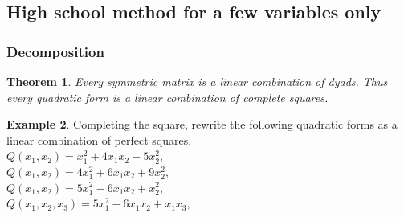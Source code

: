 \documentclass[aspectratio=169,notheorems]{corvinusmetropolis}
\newtheorem{theorem}{Theorem}
\theoremstyle{definition}
\newtheorem{example}[theorem]{Example}
\begin{document}
\subsection{High school method for a few variables only}
\begin{frame}
    \frametitle{Decomposition}
    \begin{theorem}
        Every symmetric matrix is a linear combination of dyads. Thus
        every quadratic form is a linear combination of complete squares.
    \end{theorem}
\begin{example}
    Completing the square, rewrite the following quadratic forms as a linear combination of perfect squares.\\
    $Q\left( x_1,x_2 \right)=x_1^2+4x_1x_2-5x_2^2,$\\
    $Q\left( x_1,x_2 \right)=4x_1^2+6x_1x_2+9x_2^2,$\\
    $Q\left( x_1,x_2 \right)=5x_1^2-6x_1x_2+x_2^2,$\\
    $Q\left( x_1,x_2,x_3 \right)=5x_1^2-6x_1x_2+x_1x_3,$\\
\end{example}
\end{frame}
\end{document}
